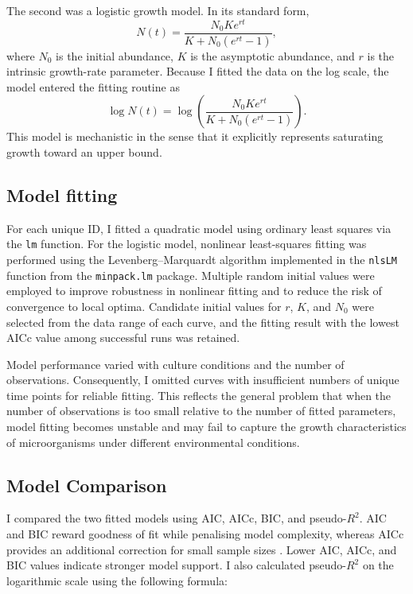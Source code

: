 \documentclass{article}
\begin{document}
The second was a logistic growth model. In its standard form,
\[
N(t) = \frac{N_0 K e^{rt}}{K + N_0(e^{rt}-1)},
\]
where \(N_0\) is the initial abundance, \(K\) is the asymptotic abundance, and \(r\) is the intrinsic growth-rate parameter. Because I fitted the data on the log scale, the model entered the fitting routine as
\[
\log N(t) = \log \left( \frac{N_0 K e^{rt}}{K + N_0(e^{rt}-1)} \right).
\]
This model is mechanistic in the sense that it explicitly represents saturating growth toward an upper bound.

\subsection{Model fitting}

For each unique ID, I fitted a quadratic model using ordinary least squares via the \texttt{lm} function. For the logistic model, nonlinear least-squares fitting was performed using the Levenberg--Marquardt algorithm implemented in the \texttt{nlsLM} function from the \texttt{minpack.lm} package. Multiple random initial values were employed to improve robustness in nonlinear fitting and to reduce the risk of convergence to local optima. Candidate initial values for \(r\), \(K\), and \(N_0\) were selected from the data range of each curve, and the fitting result with the lowest AICc value among successful runs was retained.

Model performance varied with culture conditions and the number of observations. Consequently, I omitted curves with insufficient numbers of unique time points for reliable fitting. This reflects the general problem that when the number of observations is too small relative to the number of fitted parameters, model fitting becomes unstable and may fail to capture the growth characteristics of microorganisms under different environmental conditions.

\subsection{Model Comparison}

I compared the two fitted models using AIC, AICc, BIC, and pseudo-\(R^2\). AIC and BIC reward goodness of fit while penalising model complexity, whereas AICc provides an additional correction for small sample sizes \citep{BurnhamAnderson2004}. Lower AIC, AICc, and BIC values indicate stronger model support. I also calculated pseudo-\(R^2\) on the logarithmic scale using the following formula:
\end{document}
